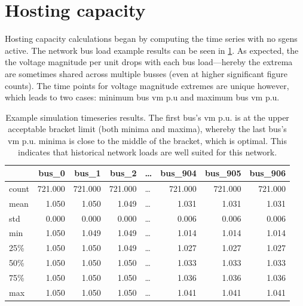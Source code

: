 \documentclass[a4paper,10pt]{report}
\begin{document}
\section{Hosting capacity}
Hosting capacity calculations began by computing the time series with no sgens active. The network bus load example results can be seen in \cref{hosting_time_series_table}. As expected, the the voltage magnitude per unit drops with each bus load---hereby the extrema are sometimes shared across multiple busses (even at higher significant figure counts). The time points for voltage magnitude extremes are unique however, which leads to two cases: minimum bus vm p.u and maximum bus vm p.u.

\begin{table}[htpb]
	\centering
	\begin{tabular}{lrrrlrrr}
		\toprule
		& bus\_0 & bus\_1 & bus\_2 & \dots & bus\_904 & bus\_905 & bus\_906 \\
		\midrule
		count & 721.000 & 721.000 & 721.000 & \dots & 721.000 & 721.000 & 721.000 \\
		mean & 1.050 & 1.050 & 1.049 & \dots & 1.031 & 1.031 & 1.031 \\
		std & 0.000 & 0.000 & 0.000 & \dots & 0.006 & 0.006 & 0.006 \\
		min & 1.050 & 1.049 & 1.049 & \dots & 1.014 & 1.014 & 1.014 \\
		25\% & 1.050 & 1.050 & 1.049 & \dots & 1.027 & 1.027 & 1.027 \\
		50\% & 1.050 & 1.050 & 1.050 & \dots & 1.033 & 1.033 & 1.033 \\
		75\% & 1.050 & 1.050 & 1.050 & \dots & 1.036 & 1.036 & 1.036 \\
		max & 1.050 & 1.050 & 1.050 & \dots & 1.041 & 1.041 & 1.041 \\
		\bottomrule
	\end{tabular}
	\caption[Example simulation timeseries results]{Example simulation timeseries results. The first bus's vm p.u. is at the upper acceptable bracket limit (both minima and maxima), whereby the last bus's vm p.u. minima is close to the middle of the bracket, which is optimal. This indicates that historical network loads are well suited for this network.}
	\label{hosting_time_series_table}
\end{table}
\end{document}
